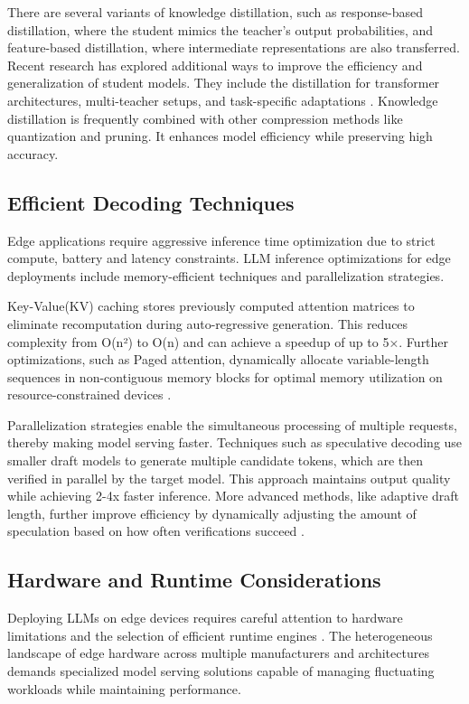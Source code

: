 \documentclass[11pt]{IEEEtran}
\begin{document}
There are several variants of knowledge distillation, such as response-based distillation, where the student mimics the teacher's output probabilities, and feature-based distillation, where intermediate representations are also transferred. Recent research has explored additional ways to improve the efficiency and generalization of student models. They include the distillation for transformer architectures, multi-teacher setups, and task-specific adaptations \cite{b27}. Knowledge distillation is frequently combined with other compression methods like quantization and pruning. It enhances model efficiency while preserving high accuracy.

\subsection{Efficient Decoding Techniques}
Edge applications require aggressive inference time optimization due to strict compute, battery and latency constraints\cite{b28}. LLM inference optimizations for edge deployments include memory-efficient techniques and parallelization strategies\cite{b29}. 

Key-Value(KV) caching stores previously computed attention matrices to eliminate recomputation during auto-regressive generation. This reduces complexity from O(n²) to O(n) and can achieve a speedup of up to 5×. Further optimizations, such as Paged attention, dynamically allocate variable-length sequences in non-contiguous memory blocks for optimal memory utilization on resource-constrained devices  \cite{b30,b31}.


Parallelization strategies enable the simultaneous processing of multiple requests, thereby making model serving faster. Techniques such as speculative decoding use smaller draft models to generate multiple candidate tokens, which are then verified in parallel by the target model. This approach maintains output quality while achieving 2-4x faster inference. More advanced methods, like adaptive draft length, further improve efficiency by dynamically adjusting the amount of speculation based on how often verifications succeed \cite{b32,b33}.

\subsection{Hardware and Runtime Considerations}
Deploying LLMs on edge devices requires careful attention to hardware limitations and the
selection of efficient runtime engines \cite{b34,b35}. The heterogeneous landscape of edge hardware across multiple manufacturers and architectures demands specialized model serving solutions capable of managing fluctuating workloads while maintaining performance\cite{b35,b36}. 
\end{document}
